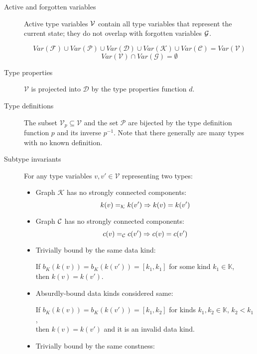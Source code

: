 \begin{description}
    \item[Active and forgotten variables]
    Active type variables $\mathcal V$ contain all type variables that represent the current state; they do not overlap with forgotten variables $\mathcal G$.

    $$Var(\mathcal{F}) \cup Var(\mathcal{P}) \cup Var(\mathcal{D}) \cup Var(\mathcal{K}) \cup Var(\mathcal{C}) = Var(\mathcal{V})$$ $$Var(\mathcal{V}) \cap Var(\mathcal{G}) = \emptyset$$

    \item[Type properties] $\mathcal{V}$ is projected into $\mathcal{D}$  by the type properties function $d$.

    \item[Type definitions] The subset $\mathcal{V}_p \subseteq \mathcal{V}$ and the set $\mathcal{P}$ are bijected by the type definition function $p$ and its inverse $p^{-1}$. Note that there generally are many types with no known definition.

    \item[Subtype invariants] For any type variables $v, v' \in \mathcal{V}$ representing two types:
        \begin{itemize}
            \item Graph $\mathcal{K}$ has no strongly connected components:
            $$k (v) =_{\mathcal{K}} k (v') \Rightarrow k (v) = k(v')$$

            \item Graph $\mathcal C$ has no strongly connected components:
            $$c (v) =_{\mathcal{C}} c (v') \Rightarrow c (v) = c(v')$$

            \item Trivially bound by the same data kind:

            If $b_K (k (v)) = b_K (k (v')) = [k_1, k_1]$ for some kind $k_1 \in \mathbb{K}$, \\
            then $k (v) = k (v')$.

            \item Absurdly-bound data kinds considered same:

            If $b_K (k (v)) = b_K (k (v')) = [k_1, k_2]$ for kinds $k_1, k_2 \in \mathbb{K}$, $k_2 < k_1$, \\
            then $k (v) = k (v')$ and it is an invalid data kind.

            \item Trivially bound by the same constness:


\end{itemize}
\end{description}
